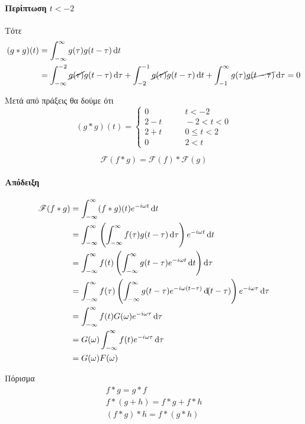 \documentclass[11pt,a4paper,titlepage,draft]{article}
\begin{document}
\paragraph{Περίπτωση \(t<-2\)} Τότε \begin{align*}
(g*g)(t) &= \int_{-\infty}^\infty g(\tau)g(t-\tau)\dif t
\\ &= \int_{-\infty}^{-2} \cancel{g(\tau)}g(t-\tau)\dif\tau
+ \int_{-2}^{-1} \cancel{g(\tau)}g(t-\tau)\dif t
+ \int_{-1}^\infty g(\tau)\cancel{g(t-\tau)}\dif\tau=0
\end{align*}

Μετά από πράξεις θα δούμε ότι
\[
(g*g)(t)=\begin{cases}
0 &\qquad t<-2\\
2-t &\qquad -2<t<0\\
2+t &\qquad 0\leq t < 2\\
0 &\qquad 2<t
\end{cases}
\]

\begin{theorem*}{}
\[
\mathscr{F}(f*g)=
\mathscr{F}(f)
*
\mathscr{F}(g)
\]
\end{theorem*}
\paragraph{Απόδειξη}
\begin{align*}
\mathscr{F}(f*g) &= \int_{-\infty}^\infty (f*g)(t)e^{-i\omega t}\dif t
\\ 
&=
\int_{-\infty}^\infty
\left(
\int_{-\infty}^\infty f(\tau)g(t-\tau)\dif \tau\right)e^{-i\omega t}\dif t
\\ &=
\int_{-\infty}^\infty f(t) \left( \int_{-\infty}^\infty
g(t-\tau)e^{-i\omega t}
\dif t \right)
\dif\tau
\\ &=
\int_{-\infty}^\infty f(\tau)
\left(
\int_{-\infty}^\infty g(t-\tau)e^{-i\omega(t-\tau)}\dif(t-\tau)
\right)
e^{-i\omega\tau}\dif\tau
\\ &=
\int_{-\infty}^\infty f(t) G(\omega) e^{-i\omega\tau}\dif\tau
\\ &=
G(\omega) \int_{-\infty}^\infty f(t) e^{-i\omega\tau}\dif \tau
\\ &= G(\omega)F(\omega)
\end{align*}

\begin{theorem*}{Πόρισμα}
\begin{gather*}
f*g=g*f\\
f*(g+h)=f*g+f*h\\
(f*g)*h=f*(g*h)
\end{gather*}
\end{theorem*}
\end{document}
